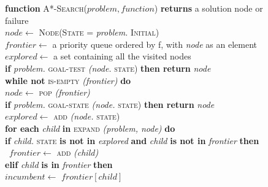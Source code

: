 \documentclass{article}
\begin{document}
\begin{figure}[t]
\begin{center}
\begin{tabbing}
\indent \textbf{fun}\=\textbf{ction} \textsc{A*-Search}($problem, function$) \textbf{returns} a solution node or failure \\

\indent \> $node \leftarrow $ \textsc{Node(State} = \emph{problem.} \textsc{Initial)}\\

\indent \> $frontier \leftarrow $ a priority queue ordered by f, with \emph{node} as an element \\

\indent \> $explored \leftarrow $ a set containing all the visited nodes \\

\indent \> \textbf{if} \emph{problem.} \textsc{goal-test} \emph{(node.} \textsc{state)} \textbf{then return} \emph{node} \\

\indent \> \textbf{while not} \= \textsc{is-empty} \emph{(frontier)} \textbf{do} \\

\indent \> \> $node \leftarrow $ \textsc{pop} \emph{(frontier)} \\

\indent \> \> \textbf{if} \emph{problem.} \textsc{goal-state} \emph{(node.} \textsc{state)} \textbf{then return} \emph{node} \\
 
 \indent \> \> $explored \leftarrow $ \textsc{add} \emph{(node.} \textsc{state)} \\
 
\indent \> \> \textbf{for each} \= \emph{child} \textbf{in} \textsc{expand} \emph{(problem, node)} \textbf{do} \\

\indent \> \> \> \textbf{if} \= \emph{child.} \textsc{state} \textbf{is not in} \emph{explored} \textbf{and} \emph{child} \textbf{is not in} \emph{frontier} \textbf{then} \\

\indent \> \> \> \> \ $frontier \leftarrow $ \textsc{add} \emph{(child)} \\

\indent \> \> \> \textbf{elif} \= \emph{child} \textbf{is in} \emph{frontier} \textbf{then} \\

\indent \> \> \> \> $incumbent \leftarrow $ $frontier[child]$ \\


\end{tabbing}
\end{center}
\end{figure}
\end{document}
